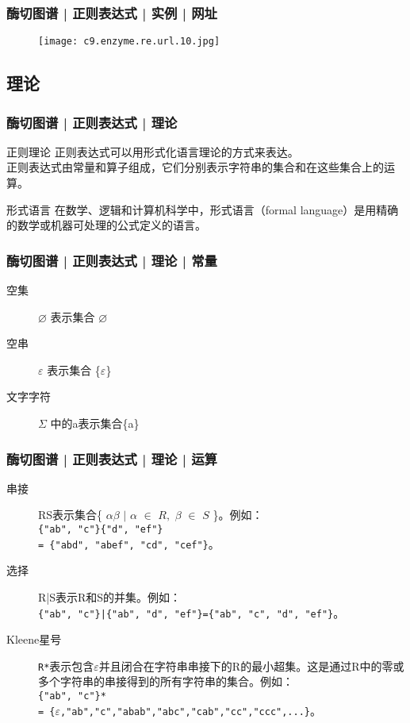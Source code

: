 \begin{frame}
  \frametitle{酶切图谱 | 正则表达式 | 实例 | 网址}
  \begin{figure}
    \centering
    \texttt{[image: c9.enzyme.re.url.10.jpg]}
  \end{figure}
\end{frame}

\subsection{理论}
\begin{frame}
  \frametitle{酶切图谱 | 正则表达式 | 理论}
  \begin{block}{正则理论}
    正则表达式可以用形式化语言理论的方式来表达。\\
    \vspace{1em}
    \alert{正则表达式由常量和算子组成，它们分别表示字符串的集合和在这些集合上的运算。}
  \end{block}
  \pause
  \begin{block}{形式语言}
    在数学、逻辑和计算机科学中，形式语言（formal language）是用精确的数学或机器可处理的公式定义的语言。
  \end{block}
\end{frame}

\begin{frame}
  \frametitle{酶切图谱 | 正则表达式 | 理论 | 常量}
  \begin{description}
    \item[空集] $\varnothing$ 表示集合 $\varnothing$
    \item[空串] $\varepsilon$ 表示集合 \{$\varepsilon$\}
    \item[文字字符] $\Sigma$ 中的a表示集合\{a\}
  \end{description}
\end{frame}

\begin{frame}[fragile]
  \frametitle{酶切图谱 | 正则表达式 | 理论 | 运算}
  \begin{description}
    \item[串接] RS表示集合\{ $\alpha\beta$ $|$ $\alpha$ $\in$  $R,$ $\beta$ $\in$ $S$ \}。例如：\\ \verb|{"ab", "c"}{"d", "ef"}| \\\verb|= {"abd", "abef", "cd", "cef"}|。
    \item[选择] R|S表示R和S的并集。例如：\\ \verb+{"ab", "c"}|{"ab", "d", "ef"}={"ab", "c", "d", "ef"}+。
    \item[Kleene星号] \verb|R*|表示包含$\varepsilon$并且闭合在字符串串接下的R的最小超集。这是通过R中的零或多个字符串的串接得到的所有字符串的集合。例如：\\ \verb|{"ab", "c"}*|\\ \verb|= {|$\varepsilon$\verb|,"ab","c","abab","abc","cab","cc","ccc",...}|。
  \end{description}
\end{frame}

